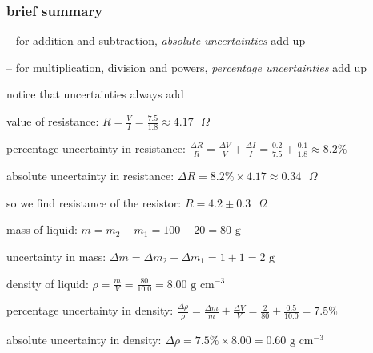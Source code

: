 \subsubsection*{brief summary}

\begin{ilight}
	-- for addition and subtraction, \emph{absolute uncertainties} add up
	
	-- for multiplication, division and powers, \emph{percentage uncertainties} add up
	
\end{ilight}

\cmt notice that uncertainties always add


value of resistance: $R=\frac{V}{I} = \frac{7.5}{1.8} \approx 4.17  \text{ }\Omega$

percentage uncertainty in resistance: $\frac{\Delta R}{R} = \frac{\Delta V}{V} + \frac{\Delta I}{I} = \frac{0.2}{7.5} + \frac{0.1}{1.8} \approx 8.2 \%$

absolute uncertainty in resistance: $\Delta R = 8.2\% \times 4.17 \approx 0.34 \text{ }\Omega$

so we find resistance of the resistor: $R = 4.2 \pm 0.3  \text{ }\Omega$ \eoe


\sol mass of liquid: $m = m_2 - m_1 = 100 -20 = 80 \text{ g}$

uncertainty in mass: $\Delta m = \Delta m_2 + \Delta m_1 = 1 + 1 = 2 \text{ g}$

density of liquid: $\rho = \frac{m}{V} = \frac{80}{10.0} = 8.00 \text{ g cm}^{-3}$

percentage uncertainty in density: $\frac{\Delta \rho}{\rho} = \frac{\Delta m}{m} + \frac{\Delta V}{V} = \frac{2}{80} + \frac{0.5}{10.0} = 7.5 \%$

absolute uncertainty in density: $\Delta \rho = 7.5\% \times 8.00 = 0.60 \text{ g cm}^{-3}$

